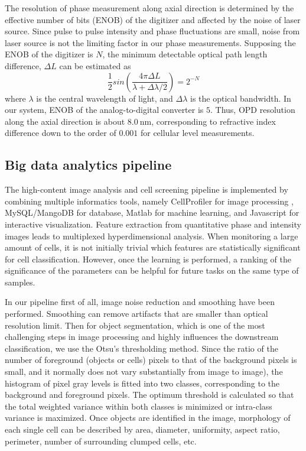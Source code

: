 \documentclass[aps,pra,reprint,superscriptaddress]{revtex4-1}
\begin{document}
The resolution of phase measurement along axial direction is determined by the effective number of bits (ENOB) of the digitizer and affected by the noise of laser source. Since pulse to pulse intensity and phase fluctuations are small, noise from laser source is not the limiting factor in our phase measurements. Supposing the ENOB of the digitizer is $N$, the minimum detectable optical path length difference, $\Delta L$ can be estimated as
\begin{equation}
\frac{1}{2}sin\left(\frac{4\pi \Delta L}{\lambda + \Delta \lambda/2}\right)=2^{-N}
\end{equation}
where $\lambda$ is the central wavelength of light, and $\Delta\lambda$ is the optical bandwidth. In our system, ENOB of the analog-to-digital converter is $5$. Thus, OPD resolution along the axial direction is about $\SI{8.0}{\nano\meter}$, corresponding to refractive index difference down to the order of $0.001$ for cellular level measurements.


\subsection{Big data analytics pipeline}

The high-content image analysis and cell screening pipeline is implemented by combining multiple informatics tools, namely CellProfiler for image processing \cite{carpenter2006cellprofiler,kamentsky2011improved}, MySQL/MangoDB for database, Matlab for machine learning, and Javascript for interactive visualization. 
Feature extraction from quantitative phase and intensity images leads to multiplexed hyperdimensional analysis. When monitoring a large amount of cells, it is not initially trivial which features are statistically significant for cell classification. However, once the learning is performed, a ranking of the significance of the parameters can be helpful for future tasks on the same type of samples. 

In our pipeline first of all, image noise reduction and smoothing have been performed. Smoothing can remove artifacts that are smaller than optical resolution limit. Then for object segmentation, which is one of the most challenging steps in image processing and highly influences the downstream classification, we use the Otsu's thresholding method. Since the ratio of the number of foreground (objects or cells) pixels to that of the background pixels is small, and it normally does not vary substantially from image to image), the histogram of pixel gray levels is fitted into two classes,  corresponding to the background and foreground pixels. The optimum threshold is calculated so that the total weighted variance within both classes is minimized or intra-class variance is maximized. Once objects are identified in the image, morphology of each single cell can be described by area, diameter, uniformity, aspect ratio, perimeter, number of surrounding clumped cells, etc.
\end{document}
